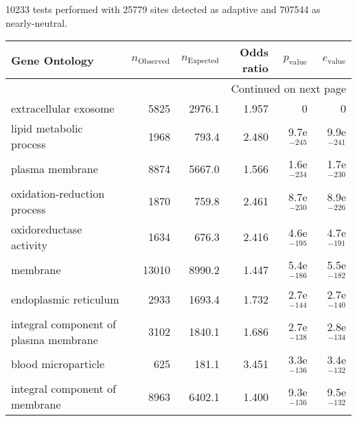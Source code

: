 10233 tests performed with 25779 sites detected as adaptive and 707544 as nearly-neutral.
\scriptsize
\begin{longtable}{lrrrrr}
\toprule
                                     Gene Ontology & $n_{\mathrm{Observed}}$ & $n_{\mathrm{Expected}}$ & Odds ratio & $p_{\mathrm{value}}$ & $e_{\mathrm{value}}$ \\
\midrule
\endhead
\midrule
\multicolumn{6}{r}{{Continued on next page}} \\
\midrule
\endfoot

\bottomrule
\endlastfoot
                             extracellular exosome &                    5825 &                  2976.1 &      1.957 &                    0 &                    0 \\
                           lipid metabolic process &                    1968 &                   793.4 &      2.480 &        9.7e$^{-245}$ &        9.9e$^{-241}$ \\
                                   plasma membrane &                    8874 &                  5667.0 &      1.566 &        1.6e$^{-234}$ &        1.7e$^{-230}$ \\
                       oxidation-reduction process &                    1870 &                   759.8 &      2.461 &        8.7e$^{-230}$ &        8.9e$^{-226}$ \\
                           oxidoreductase activity &                    1634 &                   676.3 &      2.416 &        4.6e$^{-195}$ &        4.7e$^{-191}$ \\
                                          membrane &                   13010 &                  8990.2 &      1.447 &        5.4e$^{-186}$ &        5.5e$^{-182}$ \\
                             endoplasmic reticulum &                    2933 &                  1693.4 &      1.732 &        2.7e$^{-144}$ &        2.7e$^{-140}$ \\
             integral component of plasma membrane &                    3102 &                  1840.1 &      1.686 &        2.7e$^{-138}$ &        2.8e$^{-134}$ \\
                               blood microparticle &                     625 &                   181.1 &      3.451 &        3.3e$^{-136}$ &        3.4e$^{-132}$ \\
                    integral component of membrane &                    8963 &                  6402.1 &      1.400 &        9.3e$^{-136}$ &        9.5e$^{-132}$ \\

\end{longtable}
